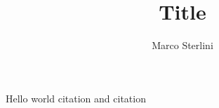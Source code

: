 \documentclass{article}
\begin{document}
\date{}
\author{Marco Sterlini}

\title{Title}
\maketitle

Hello world citation \cite{css-extended} and citation \cite{css-paper}

\pagebreak
\printbibliography
\end{document}
